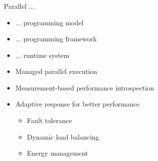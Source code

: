 \begin{frame}[t]
\frametitle{\charm}
\framesubtitle{}
	\begin{block}{Parallel ...}
		\begin{itemize}
		\item ... programming model
		\item ... programming framework
		\item \alert{... runtime system}
	\end{itemize}
	\end{block}
    \begin{itemize}[<+->]
        \item Managed parallel execution
        \item Measurement-based performance introspection
        \item Adaptive response for better performance
        \begin{itemize}
            \item Fault tolerance
            \item Dynamic load balancing
            \item Energy management
        \end{itemize}
    \end{itemize}
\end{frame}


